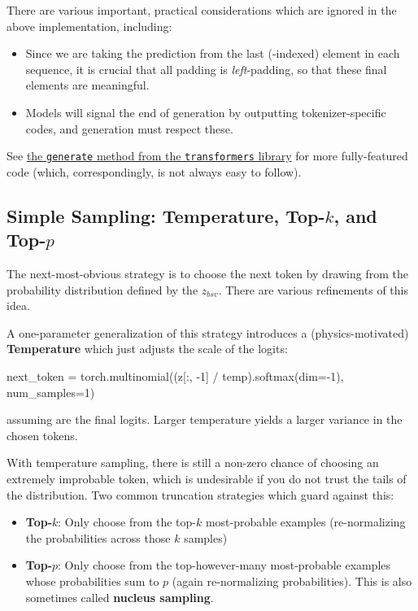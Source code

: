 \documentclass[11pt]{article}
\begin{document}
There are various important, practical considerations which are ignored in the above implementation, including:
\begin{itemize}
	\item Since we are taking the prediction from the last (-indexed) element in each
	      sequence, it is crucial that all padding is \textit{left}-padding, so that these final
	      elements are meaningful.
	\item Models will signal the end of generation by outputting tokenizer-specific codes, and
	      generation must respect these.
\end{itemize}
See
\href{https://github.com/huggingface/transformers/blob/04ab5605fbb4ef207b10bf2772d88c53fc242e83/src/transformers/generation/utils.py#L1115}{the
	\texttt{generate} method from the \texttt{transformers} library} for more fully-featured code
(which, correspondingly, is not always easy to follow).

\subsection{Simple Sampling: Temperature, Top-$ k $, and Top-$ p $ \label{subsec_simple_sampling}}

The next-most-obvious strategy is to choose the next token by drawing from the probability
distribution defined by the $ z _{ bsv } $. There are various refinements of this idea.

A one-parameter generalization of this strategy
introduces a (physics-motivated) \textbf{Temperature} which just adjusts the scale of the logits:
\begin{py}
next_token = torch.multinomial((z[:, -1] / temp).softmax(dim=-1), num_samples=1)
\end{py}
assuming  are the final logits. Larger temperature yields a larger variance in the chosen
tokens.

With temperature sampling, there is still a non-zero chance of choosing an extremely improbable token,
which is undesirable if you do not trust the tails of the distribution. Two common truncation
strategies which guard against this:
\begin{itemize}
	\item \textbf{Top-}$ k $: Only choose from the top-$ k $ most-probable examples (re-normalizing
	      the probabilities across those $ k $ samples)
	\item \textbf{Top-}$  p$: Only choose from the top-however-many most-probable examples whose
	      probabilities sum to $ p $ (again re-normalizing probabilities). This is also sometimes called
	      \textbf{nucleus sampling}.
\end{itemize}
\end{document}
